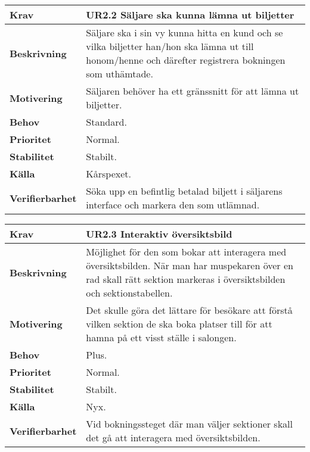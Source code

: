 \documentclass[a4paper, twoside, 11pt, titlepage]{article}
\begin{document}
		\begin{tabular} { p{2.6cm} p{12.5cm} }
			\hline
			\sffamily\textbf{Krav} & \sffamily\textbf{UR2.2 Säljare ska kunna lämna ut biljetter  } \\
			\hline
			\sffamily\textbf{Beskrivning} & Säljare ska i sin vy kunna hitta en kund och se vilka biljetter han/hon ska lämna ut till honom/henne och därefter registrera bokningen som uthämtade.  \\
			\hline
			\sffamily\textbf{Motivering} & Säljaren behöver ha ett gränssnitt för att lämna ut biljetter.  \\
			\hline
			\sffamily\textbf{Behov} & Standard.  \\
			\hline
			\sffamily\textbf{Prioritet} & Normal.  \\
			\hline
			\sffamily\textbf{Stabilitet} & Stabilt.  \\
			\hline
			\sffamily\textbf{Källa} & Kårspexet.  \\
			\hline
			\sffamily\textbf{Verifierbarhet} & Söka upp en befintlig betalad biljett i säljarens interface och markera den som utlämnad.  \\
			\hline
		\end{tabular}
		\vspace{6mm}

		\begin{tabular} { p{2.6cm} p{12.5cm} }
			\hline
			\sffamily\textbf{Krav} & \sffamily\textbf{UR2.3 Interaktiv översiktsbild  } \\
			\hline
			\sffamily\textbf{Beskrivning} & Möjlighet för den som bokar att interagera med översiktsbilden. När man har muspekaren över en rad skall rätt sektion markeras i översiktsbilden och sektionstabellen.  \\
			\hline
			\sffamily\textbf{Motivering} & Det skulle göra det lättare för besökare att förstå vilken sektion de ska boka platser till för att hamna på ett visst ställe i salongen.  \\
			\hline
			\sffamily\textbf{Behov} & Plus.  \\
			\hline
			\sffamily\textbf{Prioritet} & Normal.  \\
			\hline
			\sffamily\textbf{Stabilitet} & Stabilt.  \\
			\hline
			\sffamily\textbf{Källa} & Nyx.  \\
			\hline
			\sffamily\textbf{Verifierbarhet} & Vid bokningssteget där man väljer sektioner skall det gå att interagera med översiktsbilden.  \\
			\hline
		\end{tabular}
		\vspace{6mm}
\end{document}
